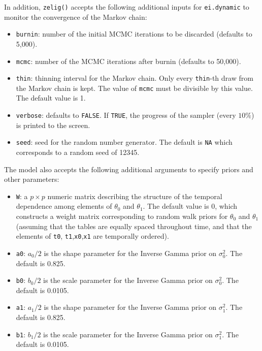 In addition, {\tt zelig()} accepts the following additional inputs for
\texttt{ei.dynamic} to monitor the convergence of the Markov chain:

\begin{itemize}
\item \texttt{burnin}: number of the initial MCMC iterations to be 
 discarded (defaults to 5,000). 

\item \texttt{mcmc}: number of the MCMC iterations after burnin
(defaults to 50,000).

\item \texttt{thin}: thinning interval for the Markov chain. Only every 
 \texttt{thin}-th draw from the Markov chain is kept. The value of 
\texttt{mcmc} must be divisible by this value. The default value is 1.

\item \texttt{verbose}: defaults to {\tt FALSE}.  If \texttt{TRUE}, the progress 
 of the sampler (every $10\%$) is printed to the screen.

\item \texttt{seed}: seed for the random number generator. The default
is \texttt{NA} which corresponds to a random seed of 12345. 

\end{itemize}

\noindent The model also accepts the following additional arguments to
specify priors and other parameters:

\begin{itemize}
\item \texttt{W}: a $p \times p$ numeric matrix describing the
structure of the temporal dependence among elements of $\theta_0$ and
$\theta_1$. The default value is 0, which constructs a weight matrix
corresponding to random walk priors for $\theta_0$ and $\theta_1$
(assuming that the tables are equally spaced throughout time, and that
the elements of \texttt{t0},
\texttt{t1},\texttt{x0},\texttt{x1} are temporally ordered). 

\item \texttt{a0}: $a_{0}/2$ is the shape parameter for the Inverse Gamma
prior on $\sigma_{0}^{2}$. The default is 0.825.

\item \texttt{b0}: $b_{0}/2$ is the scale parameter for the Inverse Gamma
prior on $\sigma_{0}^{2}$. The default is 0.0105.

\item \texttt{a1}: $a_{1}/2$ is the shape parameter for the Inverse Gamma
prior on $\sigma_{1}^{2}$. The default is 0.825.

\item \texttt{b1}: $b_{1}/2$ is the scale parameter for the Inverse Gamma
prior on $\sigma_{1}^{2}$. The default is 0.0105.
\end{itemize}

